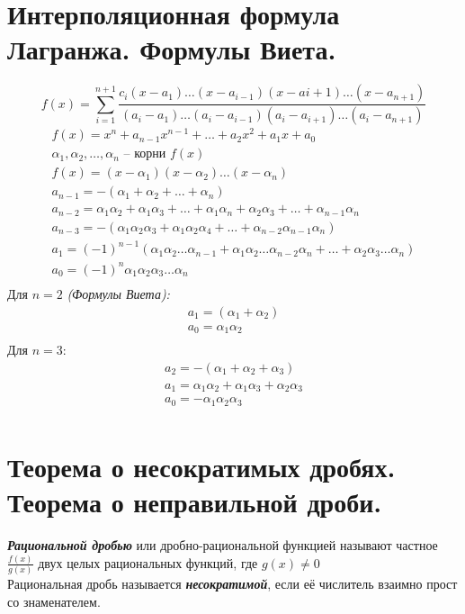 \documentclass[12pt, fleqn]{article}
\begin{document}
\section{Интерполяционная формула Лагранжа. Формулы Виета.}
$$f(x)=\sum_{i=1}^{n+1}\frac{c_i\left(x-a_1\right)\dots \left(x-a_{i-1}\right)\left(x-a{i+1}\right)\dots \left(x-a_{n+1}\right)}{\left(a_i-a_1\right)\dots \left(a_i-a_{i-1}\right)\left(a_i-a_{i+1}\right)\dots \left(a_i-a_{n+1}\right)}$$
\begin{multline*}
	f(x) = x^n+a_{n-1}x^{n-1}+\dots +a_2x^2+a_1x+a_0\\
	\alpha_1, \alpha_2, \dots , \alpha_n \text{ -- корни }f(x)\\
	f(x)=\left(x-\alpha_1\right)\left(x-\alpha_2\right)\dots \left(x-\alpha_n\right)\\
	a_{n-1}=-\left(\alpha_1+\alpha_2+\dots +\alpha_n\right)\\
	a_{n-2}=\alpha_1\alpha_2+\alpha_1\alpha_3+\dots +\alpha_1\alpha_n+\alpha_2\alpha_3+\dots +\alpha_{n-1}\alpha_n\\
	a_{n-3}=-\left(\alpha_1\alpha_2\alpha_3+\alpha_1\alpha_2\alpha_4+\dots +\alpha_{n-2}\alpha_{n-1}\alpha_n\right)\\
	a_1=\left(-1\right)^{n-1}\left(\alpha_1\alpha_2\dots \alpha_{n-1}+\alpha_1\alpha_2\dots \alpha_{n-2}\alpha_n+\dots +\alpha_2\alpha_3\dots \alpha_n\right)\\
	a_0=\left(-1\right)^n\alpha_1\alpha_2\alpha_3\dots \alpha_n\\
\end{multline*}
Для $n=2$ \textit{(Формулы Виета):}
\begin{multline*}
	a_1=\left(\alpha_1+\alpha_2\right)\\
	a_0=\alpha_1\alpha_2\\
\end{multline*}
Для $n=3$:
\begin{multline*}
	a_2=-\left(\alpha_1+\alpha_2+\alpha_3\right)\\
	a_1=\alpha_1\alpha_2+\alpha_1\alpha_3+\alpha_2\alpha_3\\
	a_0=-\alpha_1\alpha_2\alpha_3\\
\end{multline*}
\section{Теорема о несократимых дробях. Теорема о неправильной дроби.}
\textbf{\textit{Рациональной дробью}} или дробно-рациональной функцией называют частное $\frac{f(x)}{g(x)}$ двух целых рациональных функций, где $g(x) \neq 0$\\
Рациональная дробь называется \textbf{\textit{несократимой}}, если её числитель взаимно прост со знаменателем.
\end{document}
